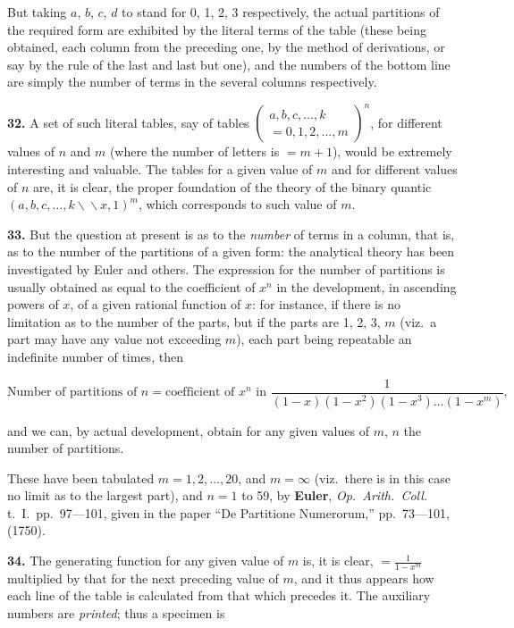 \documentclass[11pt,a4paper]{book}
\begin{document}
But taking $a$, $b$, $c$, $d$ to stand for 0, 1, 2, 3 respectively, the actual partitions of
the required form are exhibited by the literal terms of the table (these being obtained,
each column from the preceding one, by the method of derivations, or say by the
rule of the last and last but one), and the numbers of the bottom line are simply
the number of terms in the several columns respectively.

\textbf{32.} A set of such literal tables, say of tables $\begin{pmatrix} a, b, c, \ldots, k \\ =0, 1, 2, \ldots, m \end{pmatrix}^{n}$,
for different values of $n$ and $m$ (where the number of letters is $= m+1$), would be extremely
interesting and valuable. The tables for a given value of $m$ and for different values
of $n$ are, it is clear, the proper foundation of the theory of the binary quantic
$(a, b, c, \ldots, k \backslash\!\!\backslash x, 1)^{m}$, which corresponds to such value of $m$.

\textbf{33.} But the question at present is as to the \textit{number} of terms in a column,
that is, as to the number of the partitions of a given form: the analytical theory
has been investigated by Euler and others. The expression for the number of
partitions is usually obtained as equal to the coefficient of $x^{n}$ in the development, in
ascending powers of $x$, of a given rational function of $x$: for instance, if there is no
limitation as to the number of the parts, but if the parts are 1, 2, 3, $m$ (viz.\ a
part may have any value not exceeding $m$), each part being repeatable an indefinite
number of times, then

\[\text{Number of partitions of } n = \text{coefficient of } x^{n} \text{ in } \frac{1}{(1-x)(1-x^{2})(1-x^{3})\ldots(1-x^{m})},\]

and we can, by actual development, obtain for any given values of $m$, $n$ the number
of partitions.

These have been tabulated $m = 1, 2, \ldots, 20$, and $m = \infty$ (viz.\ there is in this case
no limit as to the largest part), and $n = 1$ to 59, by
\quad\textbf{Euler}, \textit{Op.\ Arith.\ Coll.} t.\ I.\ pp.\ 97---101,
given in the paper ``De Partitione Numerorum,'' pp.\ 73---101, (1750).

\textbf{34.} The generating function for any given value of $m$ is, it is clear, $= \frac{1}{1-x^{m}}$
multiplied by that for the next preceding value of $m$, and it thus appears how each line
of the table is calculated from that which precedes it. The auxiliary numbers are
\textit{printed}; thus a specimen is
\end{document}
